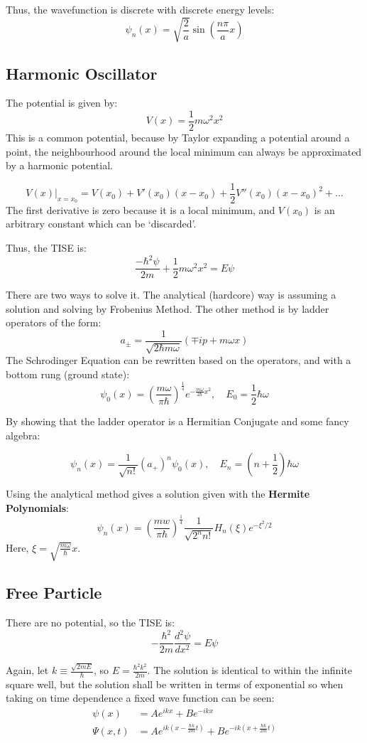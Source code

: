 \documentclass[12pt]{article}
\begin{document}
Thus, the wavefunction is discrete with discrete energy levels:
\[\boxed{\psi_n(x) = \sqrt{\frac{2}{a}}\sin\left({\frac{n\pi }{a}}x\right)}\]


\subsection{Harmonic Oscillator}
The potential is given by:
\[ V(x) = \frac12 m\omega^2x^2\]
This is a common potential, because by Taylor expanding a potential around a point, the neighbourhood around the local minimum can always be approximated by a harmonic potential. 

\[V(x)|_{x=x_0} = V(x_0) + V'(x_0)(x-x_0) + \frac12 V''(x_0)(x-x_0)^2 + ...\]
The first derivative is zero because it is a local minimum, and $V(x_0)$ is an arbitrary constant which can be `discarded'.

Thus, the TISE is:
\[\frac{-\hbar^2\psi}{2m} + \frac12 m\omega^2x^2 = E\psi\]

There are two ways to solve it. The analytical (hardcore) way is assuming a solution and solving by Frobenius Method. The other method is by ladder operators of the form:
\[\boxed{a_\pm = \frac{1}{\sqrt{2\hbar m \omega}}\left(\mp ip + m\omega x\right)}\]
The Schrodinger Equation can be rewritten based on the operators, and with a bottom rung (ground state):
\[\psi_0(x) = (\frac{m\omega}{\pi\hbar})^\frac14 e^{-\frac{m\omega}{2\hbar}x^2}, \quad E_0 = \frac12 \hbar \omega \]

By showing that the ladder operator is a Hermitian Conjugate and some fancy algebra:

\[\boxed{\psi_n(x) = \frac{1}{\sqrt{n!}} (a_+)^n \psi_0(x), \quad E_n = \left(n+\frac12\right) \hbar \omega}\]

Using the analytical method gives a solution given with the \textbf{Hermite Polynomials}:
\[\boxed{\psi_n(x) = \left(\frac{mw}{\pi\hbar}\right)^{\frac14}\frac{1}{\sqrt{2^nn!}}H_n(\xi)e^{-\xi^2/2}}\]
Here, $\xi = \sqrt{\frac{m\omega}{\hbar}}x$.

\subsection{Free Particle}
There are no potential, so the TISE is:
\[ -\frac{\hbar^2}{2m} \frac{d^2\psi}{dx^2} = E\psi\]

Again, let $k \equiv \frac{\sqrt{2mE}}{\hbar}$, so $E = \frac{\hbar^2k^2}{2m}$. The solution is identical to within the infinite square well, but the solution shall be written in terms of exponential so when taking on time dependence a fixed wave function can be seen:
\begin{align*}
    \psi(x) &= Ae^{ikx} + Be^{-ikx}\\
    \Psi(x,t) &= Ae^{ik(x - \frac{\hbar k}{2m}t)} + Be^{-ik(x + \frac{\hbar k}{2m} t)}
\end{align*}
\end{document}
